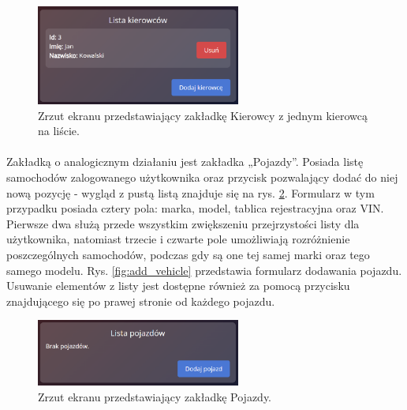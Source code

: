 \begin{figure}
	\centering
	\includegraphics[width=0.6\textwidth]{./graf/driver_tab_2.png}
	\caption{Zrzut ekranu przedstawiający zakładkę Kierowcy z jednym kierowcą na liście.}
	\label{fig:driver_tab_2}
\end{figure}

\paragraph{}
Zakładką o analogicznym działaniu jest zakładka „Pojazdy”. Posiada listę samochodów zalogowanego użytkownika oraz przycisk pozwalający dodać do niej nową pozycję - wygląd z pustą listą znajduje się na rys. \ref{fig:vehicle_tab}. Formularz w tym przypadku posiada cztery pola: marka, model, tablica rejestracyjna oraz VIN. Pierwsze dwa służą przede wszystkim zwiększeniu przejrzystości listy dla użytkownika, natomiast trzecie i czwarte pole umożliwiają rozróżnienie poszczególnych samochodów, podczas gdy są one tej samej marki oraz tego samego modelu. Rys. \ref{fig:add_vehicle} przedstawia formularz dodawania pojazdu. Usuwanie elementów z listy jest dostępne również za pomocą przycisku znajdującego się po prawej stronie od każdego pojazdu.

\begin{figure}
	\centering
	\includegraphics[width=0.6\textwidth]{./graf/vehicle_tab.png}
	\caption{Zrzut ekranu przedstawiający zakładkę Pojazdy.}
	\label{fig:vehicle_tab}
\end{figure}

